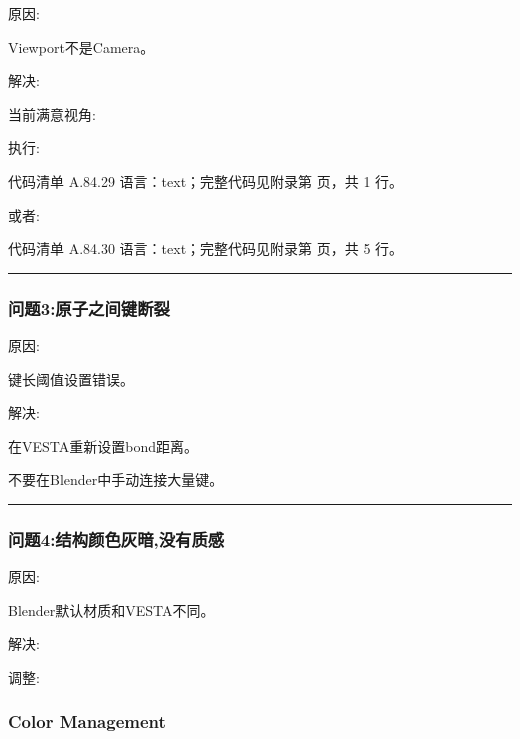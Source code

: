 \documentclass[lang=cn,scheme=chinese,color=blue,device=normal,toc=onecol,math=cm]{elegantbook}
\begin{document}
原因:\par


Viewport不是Camera。\par


解决:\par


当前满意视角:\par


执行:\par


\begin{codeindexbox}{代码清单 A.84.29}
语言：text；完整代码见附录第 \pageref{code:84:29} 页，共 1 行。
\end{codeindexbox}


或者:\par


\begin{codeindexbox}{代码清单 A.84.30}
语言：text；完整代码见附录第 \pageref{code:84:30} 页，共 5 行。
\end{codeindexbox}


\medskip\hrule\medskip


\subsubsection{问题3:原子之间键断裂}


原因:\par


键长阈值设置错误。\par


解决:\par


在VESTA重新设置bond距离。\par


不要在Blender中手动连接大量键。\par


\medskip\hrule\medskip


\subsubsection{问题4:结构颜色灰暗,没有质感}


原因:\par


Blender默认材质和VESTA不同。\par


解决:\par


调整:\par


\subsubsection{Color Management}
\end{document}
